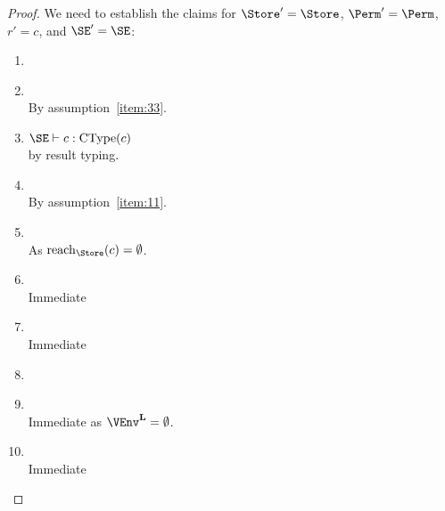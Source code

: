 \begin{proof}
  We need to establish the claims for $\Store' = \Store$,
  $\Perm'=\Perm$, $r' = c$, and $\SE' = \SE$:
  \begin{enumerate}[({R}1)]
  \item \resultOk{}{}
  \item \resultEnv{}{} \\
    By assumption~\ref{item:33}.
  \item $\SE \vdash c : \CType c$
    \\by result typing.
  \item \resultPermDom{}{}
    \\ By assumption~\ref{item:11}.
  \item \resultReachPerm{}{}
    \\ As $\Reach\Store c = \emptyset$.
  \item \resultFrame{}{}{}
    \\ Immediate
  \item \resultImmutables{}{}{}
    \\ Immediate
  \item \resultMutables{}{}{}
  \item \resultResources{}{}{}
    \\ Immediate as $\Active\VEnv = \emptyset$.
  \item \resultThinAir{}{}
    \\ Immediate
  \end{enumerate}

\end{proof}

